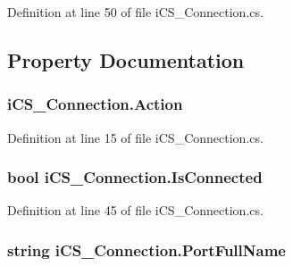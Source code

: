 Definition at line 50 of file i\+C\+S\+\_\+\+Connection.\+cs.



\subsection{Property Documentation}
\hypertarget{classi_c_s___connection_a2916ec86e442fb99344b54b3af149e51}{
\subsubsection[{Action}]{ i\+C\+S\+\_\+\+Connection.\+Action\hspace{0.3cm}{\ttfamily [get]}}}\label{classi_c_s___connection_a2916ec86e442fb99344b54b3af149e51}


Definition at line 15 of file i\+C\+S\+\_\+\+Connection.\+cs.

\hypertarget{classi_c_s___connection_a487e8bf1d3815f9d716aaf36caf54479}{
\subsubsection[{Is\+Connected}]{\setlength{\rightskip}{0pt plus 5cm}bool i\+C\+S\+\_\+\+Connection.\+Is\+Connected\hspace{0.3cm}{\ttfamily [get]}}}\label{classi_c_s___connection_a487e8bf1d3815f9d716aaf36caf54479}


Definition at line 45 of file i\+C\+S\+\_\+\+Connection.\+cs.

\hypertarget{classi_c_s___connection_a1540678af90601d706f5cd570534887f}{
\subsubsection[{Port\+Full\+Name}]{\setlength{\rightskip}{0pt plus 5cm}string i\+C\+S\+\_\+\+Connection.\+Port\+Full\+Name\hspace{0.3cm}{\ttfamily [get]}}}\label{classi_c_s___connection_a1540678af90601d706f5cd570534887f}


